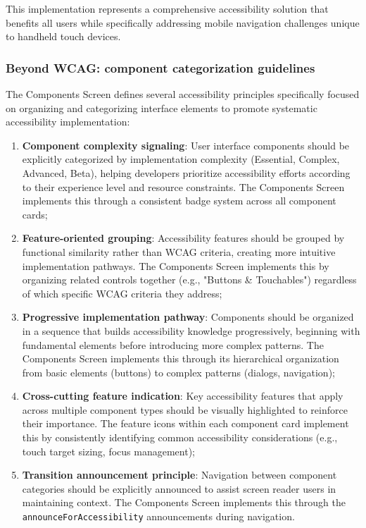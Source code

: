 This implementation represents a comprehensive accessibility solution that benefits all users while specifically addressing mobile navigation challenges unique to handheld touch devices.

\subsubsection{Beyond WCAG: component categorization guidelines}

The Components Screen defines several accessibility principles specifically focused on organizing and categorizing interface elements to promote systematic accessibility implementation:

\begin{enumerate}
    \item \textbf{Component complexity signaling}: User interface components should be explicitly categorized by implementation complexity (Essential, Complex, Advanced, Beta), helping developers prioritize accessibility efforts according to their experience level and resource constraints. The Components Screen implements this through a consistent badge system across all component cards;
    
    \item \textbf{Feature-oriented grouping}: Accessibility features should be grouped by functional similarity rather than WCAG criteria, creating more intuitive implementation pathways. The Components Screen implements this by organizing related controls together (e.g., "Buttons \& Touchables") regardless of which specific WCAG criteria they address;
    
    \item \textbf{Progressive implementation pathway}: Components should be organized in a sequence that builds accessibility knowledge progressively, beginning with fundamental elements before introducing more complex patterns. The Components Screen implements this through its hierarchical organization from basic elements (buttons) to complex patterns (dialogs, navigation);
    
    \item \textbf{Cross-cutting feature indication}: Key accessibility features that apply across multiple component types should be visually highlighted to reinforce their importance. The feature icons within each component card implement this by consistently identifying common accessibility considerations (e.g., touch target sizing, focus management);
    
    \item \textbf{Transition announcement principle}: Navigation between component categories should be explicitly announced to assist screen reader users in maintaining context. The Components Screen implements this through the \texttt{announceForAccessibility} announcements during navigation.
\end{enumerate}

